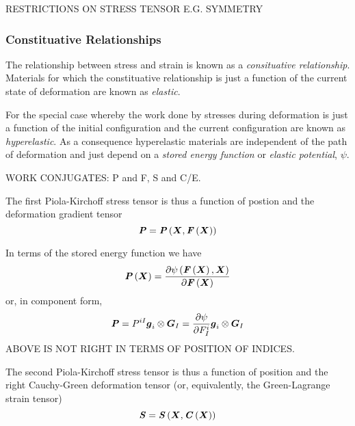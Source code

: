 RESTRICTIONS ON STRESS TENSOR E.G. SYMMETRY

\subsubsection{Constituative Relationships}

The relationship between stress and strain is known as a \emph{consituative
  relationship}. Materials for which the constituative relationship is just a
function of the current state of deformation are known as \emph{elastic}.


For the special case whereby the work done by stresses during deformation is
just a function of the initial configuration and the current configuration are
known as \emph{hyperelastic}. As a consequence hyperelastic materials are
independent of the path of deformation and just depend on a \emph{stored
  energy function} or \emph{elastic potential}, $\psi$.

WORK CONJUGATES: P and F, S and C/E.

The first Piola-Kirchoff stress tensor is thus a function of postion and the
deformation gradient tensor \ie
\begin{equation}
  \boldsymbol{\mathit{P}}= \boldsymbol{\mathit{P}}\left( \boldsymbol{X}, \boldsymbol{\mathit{F}}\left( \boldsymbol{X} \right)  \right) 
\end{equation}

In terms of the stored energy function we have
\begin{equation}
   \boldsymbol{\mathit{P}}\left( \boldsymbol{X} \right) = \dfrac{\partial  \psi\left(  \boldsymbol{\mathit{F}}\left( \boldsymbol{X} \right) ,\boldsymbol{X} \right) }{\partial  \boldsymbol{\mathit{F}}\left( \boldsymbol{X} \right) } 
\end{equation}
or, in component form,
\begin{equation}
  \boldsymbol{\mathit{P}}=P^{iI} \boldsymbol{g}_{i} \otimes \boldsymbol{G}_{I} = \dfrac{\partial \psi}{\partial F^{i}_{I}}  \boldsymbol{g}_{i} \otimes \boldsymbol{G}_{I} 
\end{equation}
ABOVE IS NOT RIGHT IN TERMS OF POSITION OF INDICES.

The second Piola-Kirchoff stress tensor is thus a function of position and
the right Cauchy-Green deformation tensor (or, equivalently, the
Green-Lagrange strain tensor) \ie
\begin{equation}
  \boldsymbol{\mathit{S}}= \boldsymbol{\mathit{S}}\left( \boldsymbol{X}, \boldsymbol{\mathit{C}}\left( \boldsymbol{X} \right)  \right) 
\end{equation}




